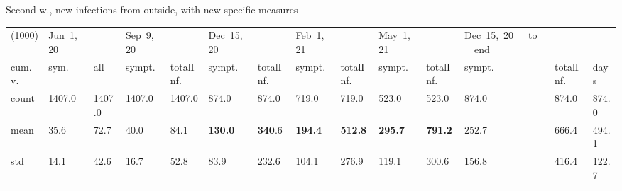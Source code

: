 \documentclass[9pt]{beamer}
\begin{document}
\begin{frame}{Second w., new infections from outside, with new specific measures}
\begin{table}[H]
\center
\tiny
\begin{tabular}{p{0.4cm}p{0.3cm}p{0.3cm}p{0.3cm}p{0.3cm}p{0.3cm}p{0.3cm}p{0.3cm}p{0.3cm}p{0.3cm}p{0.3cm}p{0.3cm}p{0.3cm}p{0.4cm}}
\toprule
(1000) &  Jun~1,~20 & &  Sep~9,~20 & & Dec~15,~20 & & Feb~1,~21 & & May~1,~21 & & Dec~15,~20~~~to~~~end   \\
cum.~v. &  sym. &  all &  sympt. &  totalInf. &  sympt. &  totalInf. &  sympt. &  totalInf. &  sympt. &  totalInf. &  sympt. &  totalInf.  & days\\
\midrule
count &   1407.0 &                     1407.0 &   1407.0 &                     1407.0 &    874.0 &                      874.0 &    719.0 &                      719.0 &    523.0 &                      523.0 &              874.0 &                   874.0 &  874.0 \\
mean  &     35.6 &                       72.7 &     40.0 &                       84.1 &    \textbf{130.0} &                      \textbf{340}.6 &    \textbf{194.4} &                      \textbf{512.8} &    \textbf{295.7} &                      \textbf{791.2} &               252.7 &                   666.4 &  494.1 \\
std   &     14.1 &                       42.6 &     16.7 &                       52.8 &     83.9 &                      232.6 &    104.1 &                      276.9 &    119.1 &                      300.6 &               156.8 &                   416.4 &  122.7 \\
\bottomrule
\end{tabular}

\label{selSpontWave2Contr2Tab}
\end{table}


\end{frame}
\end{document}
